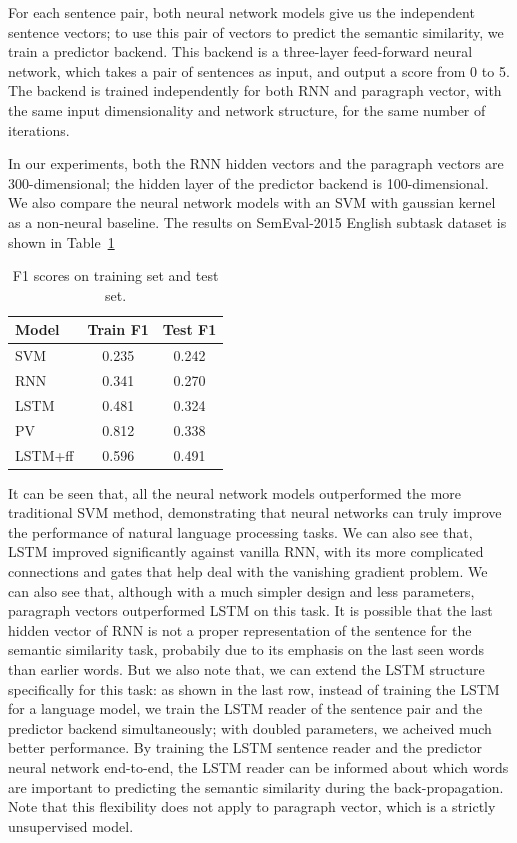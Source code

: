 For each sentence pair, both neural network models give us the independent sentence vectors; to use this pair of vectors to predict the semantic similarity, we train a predictor backend. This backend is a three-layer feed-forward neural network, which takes a pair of sentences as input, and output a score from 0 to 5. The backend is trained independently for both RNN and paragraph vector, with the same input dimensionality and network structure, for the same number of iterations. 

In our experiments, both the RNN hidden vectors and the paragraph vectors are 300-dimensional; the hidden layer of the predictor backend is 100-dimensional. We also compare the neural network models with an SVM with gaussian kernel as a non-neural baseline. The results on SemEval-2015 English subtask dataset is shown in Table~\ref{table:semeval}

\begin{table}
\centering
\begin{tabular}{|l|c|c|}
    \hline
    Model & Train F1 & Test F1 \\ \hline\hline
    SVM & 0.235 & 0.242 \\ \hline
    RNN & 0.341 & 0.270 \\ \hline
    LSTM & 0.481 & 0.324 \\ \hline
    PV & 0.812 & 0.338 \\ \hline
    LSTM+ff & 0.596 & 0.491 \\ \hline
\end{tabular}
\caption{F1 scores on training set and test set.}
\label{table:semeval}
\end{table}

It can be seen that, all the neural network models outperformed the more traditional SVM method, demonstrating that neural networks can truly improve the performance of natural language processing tasks. We can also see that, LSTM improved significantly against vanilla RNN, with its more complicated connections and gates that help deal with the vanishing gradient problem. We can also see that, although with a much simpler design and less parameters, paragraph vectors outperformed LSTM on this task. It is possible that the last hidden vector of RNN is not a proper representation of the sentence for the semantic similarity task, probabily due to its emphasis on the last seen words than earlier words. But we also note that, we can extend the LSTM structure specifically for this task: as shown in the last row, instead of training the LSTM for a language model, we train the LSTM reader of the sentence pair and the predictor backend simultaneously; with doubled parameters, we acheived much better performance. By training the LSTM sentence reader and the predictor neural network end-to-end, the LSTM reader can be informed about which words are important to predicting the semantic similarity during the back-propagation. Note that this flexibility does not apply to paragraph vector, which is a strictly unsupervised model.

